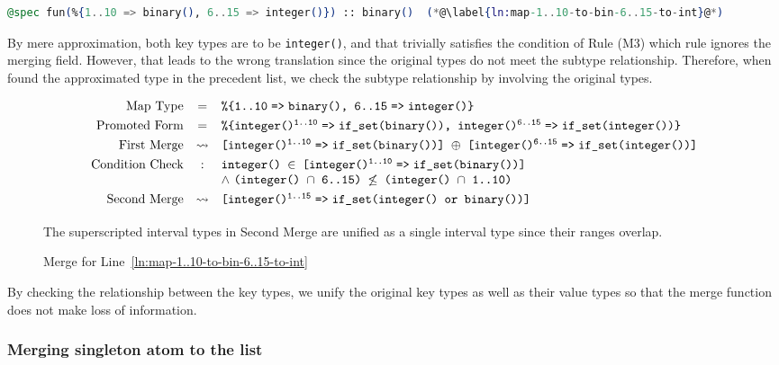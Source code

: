 \begin{lstlisting}[language=Elixir, firstnumber=last]
@spec fun(%{1..10 => binary(), 6..15 => integer()}) :: binary()  (*@\label{ln:map-1..10-to-bin-6..15-to-int}@*)
\end{lstlisting}

By mere approximation, both key types are to be \texttt{integer()}, and that trivially satisfies the condition of Rule \textsc(M3) which rule ignores the merging field.
However, that leads to the wrong translation since the original types do not meet the subtype relationship.
Therefore, when found the approximated type in the precedent list, we check the subtype relationship by involving the original types.

\begin{figure}[H]
   \[\begin{array}{rcl}
      \text{Map Type} 
      &=& \texttt{\%\{1..10\fto binary(), 6..15\fto integer()\}}
      \\[0.8ex]
      \text{Promoted Form}
      &=& \texttt{\%\{\prokey{integer()}{1..10}\fto if\_set(binary()), \prokey{integer()}{6..15}\fto if\_set(integer())\}}
      \\[0.8ex]
      \text{First Merge}
      &\leadsto& \texttt{[\prokey{integer()}{1..10}\fto if\_set(binary())] $\oplus$ [\prokey{integer()}{6..15}\fto if\_set(integer())]}
      \\[0.8ex]
      \text{Condition Check}
      &:& \texttt{integer() $\in$ [\prokey{integer()}{1..10}\fto if\_set(binary())]}
      \\ && \wedge\,\,\texttt{(integer() $\cap$ 6..15) $\not\le$ (integer() $\cap$ 1..10)}
      \\[0.8ex]
      \text{Second Merge}
      &\leadsto& \texttt{[\prokey{integer()}{1..15}\fto if\_set(integer() or binary())]}
      \nl
   \end{array}\]
   The superscripted interval types in Second Merge are unified as a single interval type since their ranges overlap.
   \caption{Merge for Line~\ref{ln:map-1..10-to-bin-6..15-to-int}}
\end{figure}

By checking the relationship between the key types, we unify the original key types as well as their value types so that the merge function does not make loss of information.

\subsubsection*{Merging singleton atom to the list}

